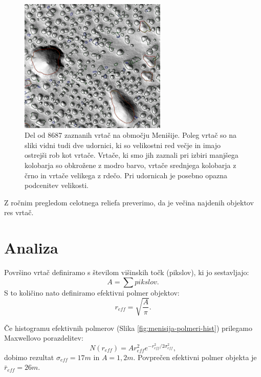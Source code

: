 \documentclass[a4paper, twoside, 12pt]{book}
\begin{document}
  \begin{figure}[h]
    \begin{center}
      \includegraphics[width=7cm]{slike/menisija-vrtace}
    \end{center}
    \caption{Del od 8687 zaznanih vrtač na območju Menišije. Poleg vrtač so na sliki vidni tudi dve udornici, ki so velikostni red večje in imajo ostrejši rob kot vrtače. Vrtače, ki smo jih zaznali pri izbiri manjšega kolobarja so obkrožene z modro barvo, vrtače srednjega kolobarja z črno in vrtače velikega z rdečo. Pri udornicah je posebno opazna podcenitev velikosti.}
    \label{fig:menisija-vrtace}
  \end{figure}

Z ročnim pregledom celotnega reliefa preverimo, da je večina najdenih objektov res vrtač.

  \section{Analiza}

  Površino vrtač definiramo s številom višinskih točk (pikslov), ki jo sestavljajo:
    \begin{equation}
      A = \sum pikslov.
    \end{equation}
S to količino nato definiramo efektivni polmer objektov:
    \begin{equation} 
      r_{eff} = \sqrt{\frac{A}{\pi}}. 
    \end{equation}

  Če histogramu efektivnih polmerov (Slika \ref{fig:menisija-polmeri-hist}) prilegamo Maxwellovo porazdelitev:
\begin{equation} 
  N(r_{eff}) = A r_{eff}^2 e^{-r_{eff}^2/ 2 \sigma_{eff}^2},
\end{equation}
dobimo rezultat $\sigma_{eff}=17m$ in $A=1,2m$. Povprečen efektivni polmer objekta je $\bar r_{eff}=26m$.
\end{document}
